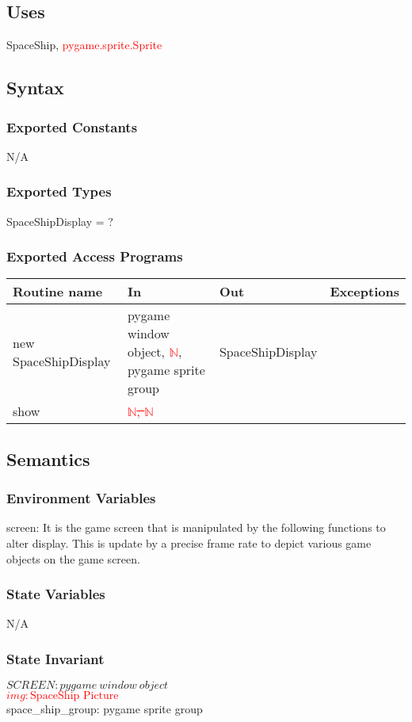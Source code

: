 \documentclass[12pt]{article}
\begin{document}
\subsection*{Uses}
SpaceShip, \textcolor{red}{pygame.sprite.Sprite}

\subsection*{Syntax}
\subsubsection*{Exported Constants}
N/A
\subsubsection*{Exported Types}
SpaceShipDisplay = ?

{\small
\subsubsection*{Exported Access Programs}
\begin{tabular}{| l | l | l | l |}
\hline
\textbf{Routine name} & \textbf{In} & \textbf{Out} & \textbf{Exceptions}\\
\hline
new SpaceShipDisplay       &pygame window object, \textcolor{red}{\st{$\mathbb{N}$}}, 
pygame sprite group     &     SpaceShipDisplay      &           \\
\hline
show       &	\textcolor{red}{\st{$\mathbb{N}$,	$\mathbb{N}$ }}    &           &          \\
\hline
\end{tabular}
}

\subsection*{Semantics}
\subsubsection*{Environment Variables}
screen: It is the game screen that is manipulated by the following functions to alter display. This is update by a precise frame rate to depict various game objects on the game screen.
\subsubsection*{State Variables}
N/A
\subsubsection*{State Invariant}
$SCREEN: pygame\ window\ object$\\
\textcolor{red}{\st{$img: \text{SpaceShip Picture}$}}\\
space\_ship\_group: pygame sprite group
\end{document}
